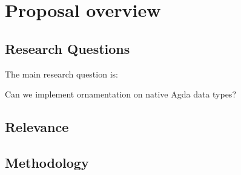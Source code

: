 \section{Proposal overview}\label{sec:proposal-overview}

\subsection{Research Questions}

The main research question is:

\begin{shaded}
Can we implement ornamentation on native Agda data types?
\end{shaded}

\subsection{Relevance}



\subsection{Methodology}

